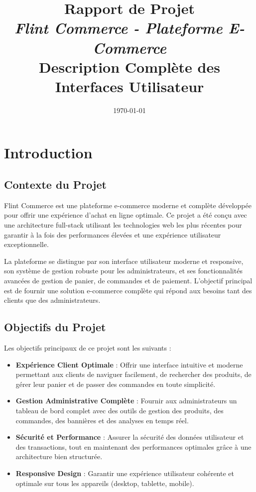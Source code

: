 \documentclass[12pt,a4paper]{article}
\title{
    \vspace{-2cm}
    \textbf{\Huge Rapport de Projet}\\
    \vspace{0.5cm}
    \Large\textit{Flint Commerce - Plateforme E-Commerce}\\
    \vspace{0.3cm}
    \large Description Complète des Interfaces Utilisateur
}
\author{}
\date{\today}
\begin{document}
\maketitle
\thispagestyle{empty}

\newpage
\tableofcontents
\newpage

\section{Introduction}

\subsection{Contexte du Projet}

Flint Commerce est une plateforme e-commerce moderne et complète développée pour offrir une expérience d'achat en ligne optimale. Ce projet a été conçu avec une architecture full-stack utilisant les technologies web les plus récentes pour garantir à la fois des performances élevées et une expérience utilisateur exceptionnelle.

La plateforme se distingue par son interface utilisateur moderne et responsive, son système de gestion robuste pour les administrateurs, et ses fonctionnalités avancées de gestion de panier, de commandes et de paiement. L'objectif principal est de fournir une solution e-commerce complète qui répond aux besoins tant des clients que des administrateurs.

\subsection{Objectifs du Projet}

Les objectifs principaux de ce projet sont les suivants :

\begin{itemize}
    \item \textbf{Expérience Client Optimale} : Offrir une interface intuitive et moderne permettant aux clients de naviguer facilement, de rechercher des produits, de gérer leur panier et de passer des commandes en toute simplicité.
    
    \item \textbf{Gestion Administrative Complète} : Fournir aux administrateurs un tableau de bord complet avec des outils de gestion des produits, des commandes, des bannières et des analyses en temps réel.
    
    \item \textbf{Sécurité et Performance} : Assurer la sécurité des données utilisateur et des transactions, tout en maintenant des performances optimales grâce à une architecture bien structurée.
    
    \item \textbf{Responsive Design} : Garantir une expérience utilisateur cohérente et optimale sur tous les appareils (desktop, tablette, mobile).
\end{itemize}
\end{document}

